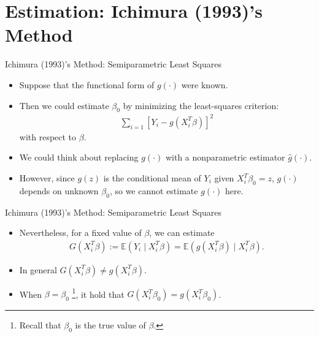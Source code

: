 \documentclass[xcolor=svgnames,dvipdfmx,cjk]{beamer}
\theoremstyle{example}
\begin{document}
\section{Estimation: Ichimura (1993)'s Method}
\begin{frame}
  \tableofcontents[currentsection]
\end{frame}

\begin{frame}{Ichimura (1993)'s Method: Semiparametric Least Squares}
\begin{itemize}
  \item Suppose that the functional form of $g(\cdot)$ were known.
  \item Then we could estimate $\beta_0$ by minimizing the least-squares criterion:
        \begin{align*}
        \sum_{i=1} \left[ Y_i - g(X_i^{T}\beta) \right]^2
        \end{align*}
        with respect to $\beta$.
  \item We could think about replacing $g(\cdot)$ with a nonparametric estimator $\hat{g}(\cdot)$.
  \item However, since $g(z)$ is the conditional mean of $Y_i$ given $X_i^{T} \beta_0 = z$,
        $g(\cdot)$ depends on unknown $\beta_0$, so we cannot estimate $g(\cdot)$ here.
\end{itemize}
\end{frame}

\begin{frame}{Ichimura (1993)'s Method: Semiparametric Least Squares}
\begin{itemize}
  \item Nevertheless, for a fixed value of $\beta$, we can estimate
        \begin{align*}
        G(X_i^{T} \beta) 
          := \mathbb{E} (Y_i \mid X_i^{T}\beta) 
           = \mathbb{E} (g(X_i^{T}\beta) \mid X_i^{T}\beta).
        \end{align*}
  \item In general $G(X_i^{T}\beta) \neq g(X_i^{T} \beta)$.
  \item When $\beta = \beta_0$ \footnote{Recall that $\beta_0$ is the true value of $\beta$.},
        it hold that $G(X_i^{T}\beta_0) = g(X_i^{T} \beta_0)$. 
\end{itemize}  
\end{frame}
\end{document}
